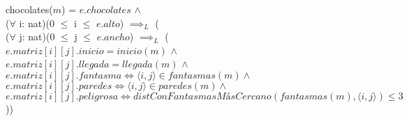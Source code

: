 \documentclass{book}
\begin{document}
            \text{}\qquad chocolates($m$) = $e.chocolates$ $\wedge$ \\
            \text{}\qquad ($\forall$ i: nat)(0 $\leq$ i $\leq$ $e.alto$) $\implies_L$ ( \\
                \text{}\qquad\quad ($\forall$ j: nat)(0 $\leq$ j $\leq$ $e.ancho$) $\implies_L$ ( \\
                \text{}\qquad\quad $e.matriz[i][j].inicio = inicio(m)$ $\wedge$ \\
                \text{}\qquad\quad $e.matriz[i][j].llegada = llegada(m)$ $\wedge$ \\
                \text{}\qquad\quad $e.matriz[i][j].fantasma \iff \langle i,j \rangle \in fantasmas(m) \wedge $ \\
                \text{}\qquad\quad $e.matriz[i][j].paredes \iff \langle i,j \rangle \in paredes(m) \wedge $ \\
                \text{}\qquad\quad $e.matriz[i][j].peligrosa \iff distConFantasmasMásCercano(fantasmas(m), \langle i,j \rangle) \leq 3$))




    \newpage
\end{document}
